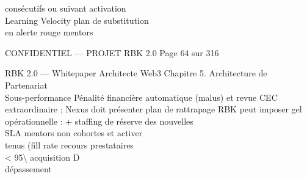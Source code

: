 consécutifs ou                                                                                                                           suivant activation\\
Learning Velocity                                                                                                                        plan de substitution\\
en alerte rouge                                                                                                                          mentors\\
\vspace{0.5em}
\vspace{0.5em}
\vspace{0.5em}
\vspace{0.5em}
\begin{confidential}CONFIDENTIEL — PROJET RBK 2.0                                             Page 64 sur 316\end{confidential}
RBK 2.0 — Whitepaper Architecte Web3                                                                                   Chapitre 5. Architecture de Partenariat\\
\vspace{0.5em}
\vspace{0.5em}
\vspace{0.5em}
Sous-performance      Pénalité financière automatique (malus) et revue CEC extraordinaire ; Nexus doit présenter plan de rattrapage RBK peut imposer gel\\
opérationnelle :      + staffing de réserve                                                                                         des nouvelles\\
SLA mentors non                                                                                                                     cohortes et activer\\
tenus (fill rate                                                                                                                    recours prestataires\\
\textless{} 95\textbackslash{}%
acquisition                                                                                                                         D\\
dépassement\\
